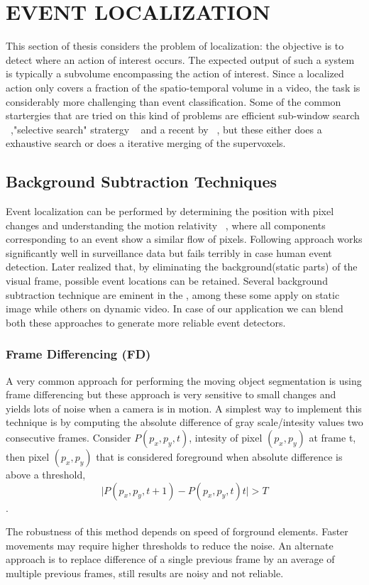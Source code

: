 \chapter{EVENT LOCALIZATION}
This section of thesis considers the problem of localization: the objective is to detect where an action of interest occurs. The expected output of such a system is typically a subvolume encompassing the action of interest. Since a localized action only covers a fraction of the spatio-temporal volume in a video, the task is considerably more challenging than event classification. Some of the common startergies that are tried on this kind of problems are efficient sub-window search ~\citep{subwindowsearch},"selective search" stratergy ~\citep{selectivesearch}  and a recent by ~\cite{tubelet}, but these either does a exhaustive search or does a iterative merging of the supervoxels. 

\section{Background Subtraction Techniques} 
\par Event localization can be performed by determining the position with pixel changes and understanding the motion relativity ~\citep{Basharat08}, where all components corresponding to an event show a similar flow of pixels. Following approach works significantly well in surveillance data but fails terribly in case human event detection. Later realized that, by eliminating the background(static parts) of the visual frame,  possible event locations can be retained.  Several background subtraction technique are eminent in the \cite{Piccardi04}, among these some apply on static image while others on dynamic video. In case of our application we can blend both these approaches to generate more reliable event detectors.

\subsection{Frame Differencing (FD)}
A very common approach for performing the moving object segmentation is using frame differencing but these approach is very sensitive to small changes and yields lots of noise when a camera is in motion. A simplest way to implement this technique is by computing the absolute difference of gray scale/intesity values two consecutive frames. Consider $P(p_x,p_y,t)$, intesity of pixel $(p_x,p_y)$ at frame t, then pixel $(p_x,p_y)$ that is considered foreground when absolute difference is above a threshold,$$\vert P(p_x,p_y,t+1) - P(p_x,p_y,t)t\vert > T$$.
\par The robustness of this method depends on speed of forground elements. Faster movements may require higher thresholds to reduce the noise.  An alternate approach is to replace difference of a single previous frame  by an average of multiple previous frames, still results are noisy and not reliable.

